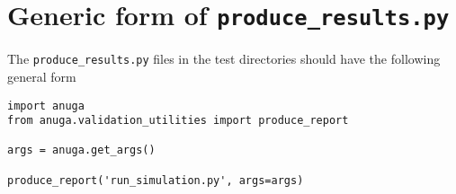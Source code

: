 \documentclass[11pt,a4paper]{report}
\begin{document}
\pagebreak
\section{Generic form of \texttt{produce\_results.py}}

The \texttt{produce\_results.py} files in the test directories should have the
following general form

\begin{verbatim}
import anuga
from anuga.validation_utilities import produce_report

args = anuga.get_args()

produce_report('run_simulation.py', args=args)
\end{verbatim}





\end{document}
